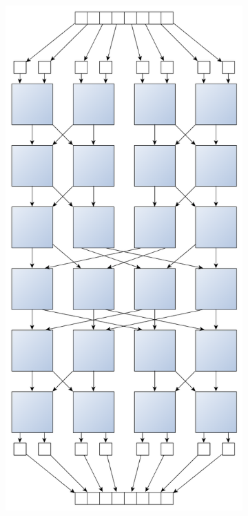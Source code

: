 \documentclass[a4paper,11pt]{article}
\begin{document}
  \begin{figure}[h!]
    \centering
    \begin{subfigure}[b]{0.4\textwidth}
        \centering
        \includegraphics[scale=0.15]{img/bitonic_sort_8_sota.png}

\end{subfigure}
\end{figure}
\end{document}
